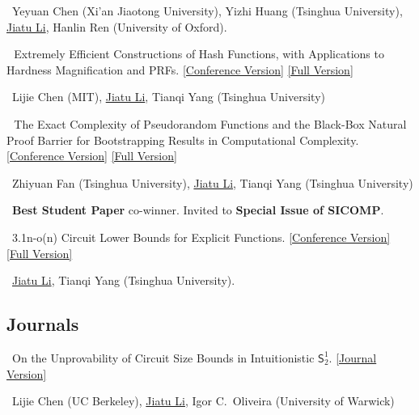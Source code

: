 \documentclass[a4paper, 11pt]{article}
\begin{document}
    \ Yeyuan Chen (Xi'an Jiaotong University), Yizhi Huang (Tsinghua University), \underline{Jiatu Li}, Hanlin Ren (University of Oxford).

    \vspace{\pubskip}
    
      \tagcc\,\tagcr\ Extremely Efficient Constructions of Hash Functions, with Applications to Hardness Magnification and PRFs. \href{https://drops.dagstuhl.de/opus/volltexte/2022/16585/}{[Conference Version]} \href{https://eccc.weizmann.ac.il/report/2022/086/}{[Full Version]}
    
    \ Lijie Chen (MIT), \underline{Jiatu Li}, Tianqi Yang (Tsinghua University) 
    
    \vspace{\pubskip}
    
     \tagcc\,\tagcr\ The Exact Complexity of Pseudorandom Functions and the Black-Box Natural Proof Barrier for Bootstrapping Results in Computational Complexity. \href{https://dl.acm.org/doi/10.1145/3519935.3520010}{[Conference Version]} \href{https://eccc.weizmann.ac.il/report/2021/125/}{[Full Version]}
    
    \ Zhiyuan Fan (Tsinghua University), \underline{Jiatu Li}, Tianqi Yang (Tsinghua University)
    
    \ \textbf{Best Student Paper} co-winner. Invited to \textbf{Special Issue of SICOMP}.
    
    \vspace{\pubskip}
    
      \tagcc\ 3.1n-o(n) Circuit Lower Bounds for Explicit Functions.
    \href{https://dl.acm.org/doi/10.1145/3519935.3519976}{[Conference Version]} \href{https://eccc.weizmann.ac.il/report/2021/023/}{[Full Version]}
    
    \ \underline{Jiatu Li}, Tianqi Yang (Tsinghua University).

\vspace{-5pt}

\subsection*{Journals}

 \tagpf\ On the Unprovability of Circuit Size Bounds in Intuitionistic $\mathsf{S}^1_2$. \href{https://lmcs.episciences.org/16491}{[Journal Version]}

\ Lijie Chen (UC Berkeley), \underline{Jiatu Li}, Igor C.~Oliveira (University of Warwick)
\end{document}
